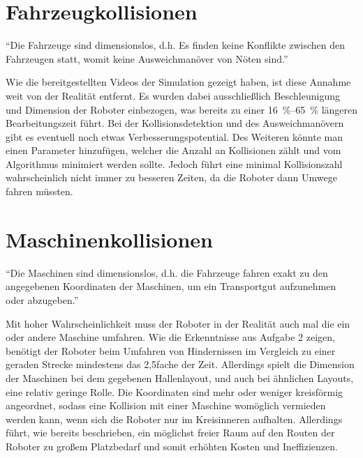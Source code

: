\documentclass[ngerman]{tudscrreprt}
\begin{document}
\section{Fahrzeugkollisionen}
\begin{displayquote}
    ``Die Fahrzeuge sind dimensionslos, d.h. Es finden keine Konflikte zwischen den Fahrzeugen statt, womit keine Ausweichmanöver von Nöten sind.'' \cite{aufgabenstellung}
\end{displayquote}
%
Wie die bereitgestellten Videos der Simulation gezeigt haben, ist diese Annahme weit von der Realität entfernt. Es wurden dabei ausschließlich Beschleunigung und Dimension der Roboter einbezogen, was bereits zu einer \SIrange{16}{65}{\percent} längeren Bearbeitungszeit führt. Bei der Kollisionsdetektion und des Ausweichmanövern gibt es eventuell noch etwas Verbesserungspotential. Des Weiteren könnte man einen Parameter hinzufügen, welcher die Anzahl an Kollisionen zählt und vom Algorithmus minimiert werden sollte. Jedoch führt eine minimal Kollisionszahl wahrscheinlich nicht immer zu besseren Zeiten, da die Roboter dann Umwege fahren müssten.

\section{Maschinenkollisionen}
\begin{displayquote}
    ``Die Maschinen sind dimensionslos, d.h. die Fahrzeuge fahren exakt zu den angegebenen Koordinaten der Maschinen, um ein Transportgut aufzunehmen oder abzugeben.'' \cite{aufgabenstellung}
\end{displayquote}
%
Mit hoher Wahrscheinlichkeit muss der Roboter in der Realität auch mal die ein oder andere Maschine umfahren. Wie die Erkenntnisse aus Aufgabe 2 zeigen, benötigt der Roboter beim Umfahren von Hindernissen im Vergleich zu einer geraden Strecke mindestens das 2,5fache der Zeit. Allerdings spielt die Dimension der Maschinen bei dem gegebenen Hallenlayout, und auch bei ähnlichen Layouts, eine relativ geringe Rolle. Die Koordinaten sind mehr oder weniger kreisförmig angeordnet, sodass eine Kollision mit einer Maschine womöglich vermieden werden kann, wenn sich die Roboter nur im Kreisinneren aufhalten. Allerdings führt, wie bereits beschrieben, ein möglichst freier Raum auf den Routen der Roboter zu großem Platzbedarf und somit erhöhten Kosten und Ineffizienzen.
\end{document}
